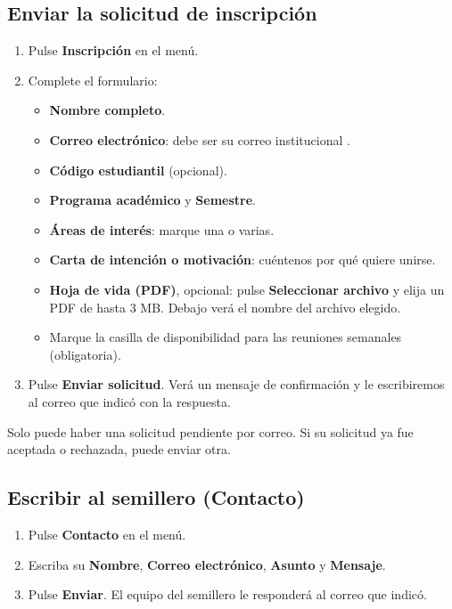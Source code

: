 \documentclass[11pt,a4paper]{article}
\newcommand{\boton}[1]{\textbf{\textcolor{siiisazul}{#1}}}
\begin{document}

\subsection{Enviar la solicitud de inscripci\'on}
\begin{enumerate}
  \item Pulse \boton{Inscripci\'on} en el men\'u.
  \item Complete el formulario:
    \begin{itemize}
      \item \textbf{Nombre completo}.
      \item \textbf{Correo electr\'onico}: debe ser su correo institucional .
      \item \textbf{C\'odigo estudiantil} (opcional).
      \item \textbf{Programa acad\'emico} y \textbf{Semestre}.
      \item \textbf{\'Areas de inter\'es}: marque una o varias.
      \item \textbf{Carta de intenci\'on o motivaci\'on}: cu\'entenos por qu\'e quiere unirse.
      \item \textbf{Hoja de vida (PDF)}, opcional: pulse \boton{Seleccionar archivo} y elija un PDF de hasta 3 MB.
        Debajo ver\'a el nombre del archivo elegido.
      \item Marque la casilla de disponibilidad para las reuniones semanales (obligatoria).
    \end{itemize}
  \item Pulse \boton{Enviar solicitud}. Ver\'a un mensaje de confirmaci\'on y le escribiremos al correo que indic\'o con
    la respuesta.
\end{enumerate}
Solo puede haber una solicitud pendiente por correo. Si su solicitud ya fue aceptada o rechazada, puede enviar otra.


\subsection{Escribir al semillero (Contacto)}
\begin{enumerate}
  \item Pulse \boton{Contacto} en el men\'u.
  \item Escriba su \textbf{Nombre}, \textbf{Correo electr\'onico}, \textbf{Asunto} y \textbf{Mensaje}.
  \item Pulse \boton{Enviar}. El equipo del semillero le responder\'a al correo que indic\'o.
\end{enumerate}
\end{document}
